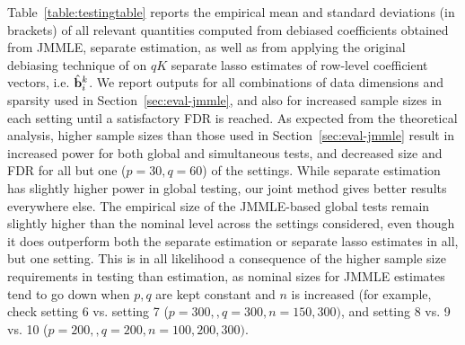 
Table~\ref{table:testingtable} reports the empirical mean and standard deviations (in brackets) of all relevant quantities computed from debiased coefficients obtained from JMMLE, separate estimation, as well as from applying the original debiasing technique of \citet{ZhangZhang14} on $qK$ separate lasso estimates of row-level coefficient vectors, i.e. $\hat {{\bf{b}}}_i^k$. We report outputs for all combinations of data dimensions and sparsity used in Section~\ref{sec:eval-jmmle}, and also for increased sample sizes in each setting until a satisfactory FDR is reached. As expected from the theoretical analysis, higher sample sizes than those used in Section~\ref{sec:eval-jmmle} result in increased power for both global and simultaneous tests, and decreased size and FDR for all but one ($p=30, q=60$) of the settings. While separate estimation has slightly higher power in global testing, our joint method gives better results everywhere else. The empirical size of the JMMLE-based global tests remain slightly higher than the nominal level across the settings considered, even though it does outperform both the separate estimation or separate lasso estimates in all, but one setting. This is in all likelihood a consequence of the higher sample size requirements in testing than estimation, as nominal sizes for JMMLE estimates tend to go down when $p,q$ are kept constant and $n$ is increased (for example, check setting 6 vs. setting 7 ($p = 300, ,q = 300, n = 150, 300)$, and setting 8 vs. 9 vs. 10 ($p = 200, ,q = 200, n = 100,200,300)$.


